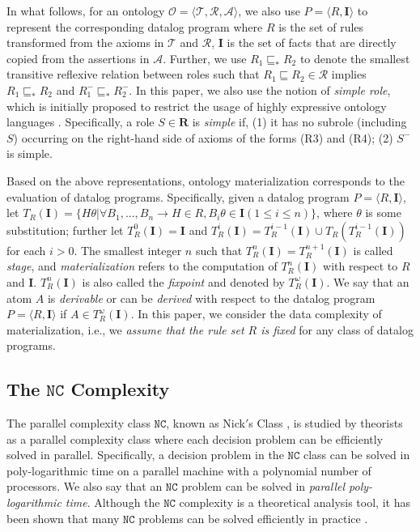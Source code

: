 \documentclass[final,1p,times]{elsarticle}
\begin{document}
In what follows, for an ontology $\mathcal{O}=\langle\mathcal{T},\mathcal{R},\mathcal{A}\rangle$,
we also use $P=\langle R, \textbf{I}\rangle$ to represent the corresponding datalog program
where $R$ is the set of rules transformed from the axioms in $\mathcal{T}$ and $\mathcal{R}$,
$\textbf{I}$ is the set of facts that are directly copied from the assertions in $\mathcal{A}$.
Further, we use $R_1\sqsubseteq_{*}R_2$ to denote the smallest transitive reflexive relation
between roles such that $R_1\sqsubseteq R_2\in\mathcal{R}$ implies $R_1\sqsubseteq_{*}R_2$
and $R_1^-\sqsubseteq_{*}R_2^-$. In this paper, we also use the
notion of \emph{simple role}, which is initially proposed to restrict the
usage of highly expressive ontology languages \cite{HorrocksS04}.
Specifically, a role $S\in\textbf{R}$ is \emph{simple} if, (1) it has no subrole (including $S$)
occurring on the right-hand side of axioms of the forms (R3) and (R4); (2) $S^-$ is simple.

Based on the above representations, ontology materialization
corresponds to the evaluation of datalog programs.
Specifically, given a datalog program $P=\langle R, \textbf{I}\rangle$,
let $T_R(\textbf{I})=\{H\theta|\forall B_1,...,B_n\rightarrow H\in R, B_i\theta\in\textbf{I} (1\leq i\leq n)\}$,
where $\theta$ is some substitution; further let $T_R^{0}(\textbf{I})=\textbf{I}$ and
 $T_R^{i}(\textbf{I})=T_R^{i-1}(\textbf{I})\cup T_R(T_R^{i-1}(\textbf{I}))$ for each $i>0$.
The smallest integer $n$ such that $T_R^{n}(\textbf{I})= T_R^{n+1}(\textbf{I})$ is called \emph{stage},
and \emph{materialization} refers to the computation of $T_R^{n}(\textbf{I})$ with respect to $R$ and \textbf{I}.
$T_R^{n}(\textbf{I})$ is also called the \emph{fixpoint} and denoted by $T_R^{\omega}(\textbf{I})$.
We say that an atom $A$ is \emph{derivable} or can be \emph{derived} with respect
to the datalog program $P=\langle R, \textbf{I}\rangle$ if $A\in T_R^{\omega}(\textbf{I})$.
In this paper, we consider the data complexity of materialization, i.e., we \emph{assume that the rule set $R$ is fixed}
for any class of datalog programs.


\subsection{The $\texttt{NC}$ Complexity}

The parallel complexity class $\texttt{NC}$, known as Nick$'$s
Class \cite{Raymond95}, is studied by theorists as a parallel complexity class
where each decision problem can be efficiently solved in parallel.
Specifically, a decision problem in the $\texttt{NC}$ class
can be solved in poly-logarithmic time on a parallel machine with a polynomial number of processors.
We also say that an $\texttt{NC}$ problem can be solved in \emph{parallel poly-logarithmic time}.
Although the $\texttt{NC}$ complexity is a theoretical analysis tool,
it has been shown that many $\texttt{NC}$ problems can be solved efficiently in practice \cite{Raymond95}.
\end{document}
